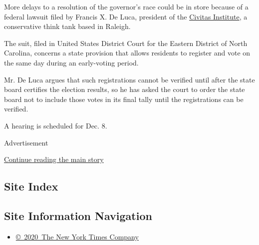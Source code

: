 More delays to a resolution of the governor's race could be in store
because of a federal lawsuit filed by Francis X. De Luca, president of
the \href{https://www.nccivitas.org/}{Civitas Institute}, a conservative
think tank based in Raleigh.

The suit, filed in United States District Court for the Eastern District
of North Carolina, concerns a state provision that allows residents to
register and vote on the same day during an early-voting period.

Mr. De Luca argues that such registrations cannot be verified until
after the state board certifies the election results, so he has asked
the court to order the state board not to include those votes in its
final tally until the registrations can be verified.

A hearing is scheduled for Dec. 8.

Advertisement

\protect\hyperlink{after-bottom}{Continue reading the main story}

\hypertarget{site-index}{%
\subsection{Site Index}\label{site-index}}

\hypertarget{site-information-navigation}{%
\subsection{Site Information
Navigation}\label{site-information-navigation}}

\begin{itemize}
\tightlist
\item
  \href{https://help.nytimes3xbfgragh.onion/hc/en-us/articles/115014792127-Copyright-notice}{©~2020~The
  New York Times Company}
\end{itemize}


